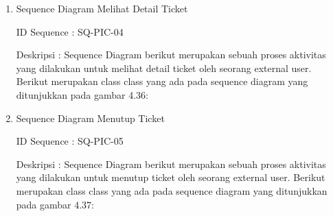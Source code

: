 \documentclass[12pt]{article}
\begin{document}
\begin{enumerate}[label=\textbf{4.\arabic*.}]
\begin{enumerate} [label=\textbf{4.2.\arabic*.}, wide, labelwidth=!, labelindent=0pt]
\begin{enumerate}[label=\textbf{4.2.2.\arabic*.}, wide, labelwidth=!, labelindent=0pt]
\begin{enumerate}[label=\arabic*.]
                
                \item Sequence Diagram Melihat Detail Ticket
                
                \noindent ID Sequence	: SQ-PIC-04
                
                \noindent Deskripsi	: Sequence Diagram berikut merupakan sebuah proses aktivitas yang dilakukan untuk melihat detail ticket oleh seorang external user. Berikut merupakan class class yang ada pada sequence diagram yang ditunjukkan pada gambar 4.36:
                
                
                \item Sequence Diagram Menutup Ticket
                
                \noindent ID Sequence	: SQ-PIC-05
                
                \noindent Deskripsi	: Sequence Diagram berikut merupakan sebuah proses aktivitas yang dilakukan untuk menutup ticket oleh seorang external user. Berikut merupakan class class yang ada pada sequence diagram yang ditunjukkan pada gambar 4.37:
                
                

\end{enumerate}
\end{enumerate}
\end{enumerate}
\end{enumerate}
\end{document}
